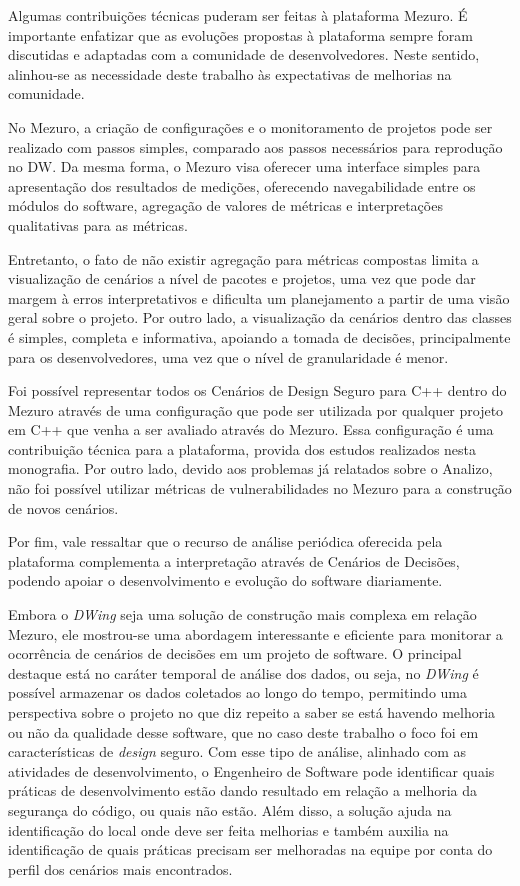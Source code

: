 Algumas contribuições técnicas puderam ser feitas à plataforma Mezuro. É importante enfatizar que as evoluções propostas à plataforma sempre foram discutidas e adaptadas com a comunidade de desenvolvedores. Neste sentido, alinhou-se as necessidade deste trabalho às expectativas de melhorias na comunidade.

No Mezuro, a criação de configurações e o monitoramento de projetos pode ser realizado com passos simples, comparado aos passos necessários para reprodução no DW. Da mesma forma, o Mezuro visa oferecer uma interface simples para apresentação dos resultados de medições, oferecendo navegabilidade entre os módulos do software, agregação de valores de métricas e interpretações qualitativas para as métricas.

Entretanto, o fato de não existir agregação para métricas compostas limita a visualização de cenários a nível de pacotes e projetos, uma vez que pode dar margem à erros interpretativos e dificulta um planejamento a partir de uma visão geral sobre o projeto. Por outro lado, a visualização da cenários dentro das classes é simples, completa e informativa, apoiando a tomada de decisões, principalmente para os desenvolvedores, uma vez que o nível de granularidade é menor.

Foi possível representar todos os Cenários de Design Seguro para C++ dentro do Mezuro através de uma configuração que pode ser utilizada por qualquer projeto em C++ que venha a ser avaliado através do Mezuro. Essa configuração é uma contribuição técnica para a plataforma, provida dos estudos realizados nesta monografia. Por outro lado, devido aos problemas já relatados sobre o Analizo, não foi possível utilizar métricas de vulnerabilidades no Mezuro para a construção de novos cenários.

Por fim, vale ressaltar que o recurso de análise periódica oferecida pela plataforma complementa a interpretação através de Cenários de Decisões, podendo apoiar o desenvolvimento e evolução do software diariamente.

Embora o \emph{DWing} seja uma solução de construção mais complexa em relação Mezuro, ele mostrou-se uma abordagem interessante e eficiente para monitorar a ocorrência de cenários de decisões em um projeto de software. O principal destaque está no caráter temporal de análise dos dados, ou seja, no \emph{DWing} é possível armazenar os dados coletados ao longo do tempo, permitindo uma perspectiva sobre o projeto no que diz repeito a saber se está havendo melhoria ou não da qualidade desse software, que no caso deste trabalho o foco foi em características de \emph{design} seguro. Com esse tipo de análise, alinhado com as atividades de desenvolvimento, o Engenheiro de Software pode identificar quais práticas de desenvolvimento estão dando resultado em relação a melhoria da segurança do código, ou quais não estão. Além disso, a solução ajuda na identificação do local onde deve ser feita melhorias e também auxilia na identificação de quais práticas precisam ser melhoradas na equipe por conta do perfil dos cenários mais encontrados.

